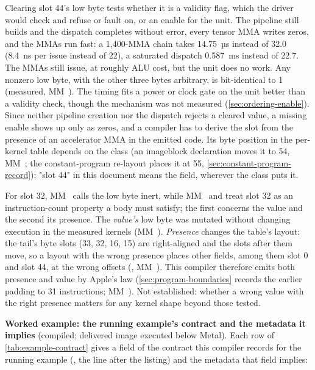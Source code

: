 Clearing slot 44's low byte tests whether it is a validity flag, which the driver would check and refuse or fault on,
or an enable for the unit. The pipeline still builds and the dispatch completes without error, every tensor MMA
writes zeros, and the MMAs run fast: a 1,400-MMA chain takes 14.75~µs instead of 32.0 (8.4~ns per issue instead of 22), a
saturated dispatch 0.587~ms instead of 22.7. The MMAs still issue, at roughly ALU cost, but the unit does no work. Any
nonzero low byte, with the other three bytes arbitrary, is bit-identical to 1 (measured, MM~). The timing fits a
power or clock gate on the unit better than a validity check, though the mechanism was not measured
(\cref{sec:ordering-enable}). Since neither pipeline creation nor the dispatch rejects a cleared value, a missing enable
shows up only as zeros, and a compiler has to derive the slot from the presence of an accelerator MMA in the emitted code. Its
byte position in the per-kernel table depends on the class (an imageblock declaration moves it to 54, MM~; the
constant-program re-layout places it at 55, \cref{sec:constant-program-record}); "slot 44" in this document means the field, wherever the class puts it.

For slot 32, MM~ calls the low byte inert, while MM~ and  treat slot 32 as an instruction-count property a body must satisfy;
the first concerns the value and the second its presence. The \emph{value's} low byte was mutated without
changing execution in the measured kernels (MM~). \emph{Presence} changes the table's layout: the tail's byte slots (33,
32, 16, 15) are right-aligned and the slots after them move, so a layout with the wrong presence places other fields,
among them slot 0 and slot 44, at the wrong offsets (, MM~). This compiler therefore emits
both presence and value by Apple's law (\cref{sec:program-boundaries} records the earlier padding to 31 instructions; MM~). Not established: whether a wrong value with the right presence matters for any kernel shape
beyond those tested.

\textbf{Worked example: the running example's contract and the metadata it implies} (compiled; delivered image executed
below Metal). Each row of \cref{tab:example-contract} gives a field of the contract this compiler records for the running example
(, the line after the listing) and the metadata that field implies:

